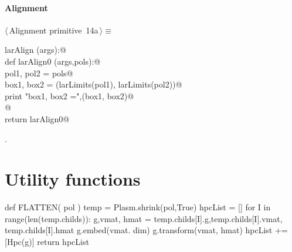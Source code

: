 \documentclass[11pt,oneside]{article}	%
\begin{document}
\paragraph{Alignment}
\begin{flushleft} \small \label{scrap28}
\protect{}$\langle\,$Alignment primitive\nobreak\ {\footnotesize 14a}$\,\rangle\equiv$
\vspace{-1ex}
\begin{list}{}{} \item
\mbox{}\verb@def larAlign (args):@\\
\mbox{}\verb@   def larAlign0 (args,pols):@\\
\mbox{}\verb@      pol1, pol2 = pols@\\
\mbox{}\verb@      box1, box2 = (larLimits(pol1), larLimits(pol2))@\\
\mbox{}\verb@      print "box1, box2 =",(box1, box2)@\\
\mbox{}\verb@      @\\
\mbox{}\verb@   return larAlign0@\\
\mbox{}\verb@@{\NWsep}
\end{list}
\vspace{-1ex}
\footnotesize\addtolength{\baselineskip}{-1ex}
\begin{list}{}{\setlength{\itemsep}{-\parsep}\setlength{\itemindent}{-\leftmargin}}
\item {\NWtxtMacroNoRef}.
\end{list}
\end{flushleft}

\appendix
\section{Utility functions}



def FLATTEN( pol )
	temp = Plasm.shrink(pol,True)
	hpcList = []
	for I in range(len(temp.childs)):			
		g,vmat, hmat = temp.childs[I].g,temp.childs[I].vmat, temp.childs[I].hmat
		g.embed(vmat. dim)
		g.transform(vmat, hmat)
		hpcList += [Hpc(g)]
	return hpcList
	
\end{document}
